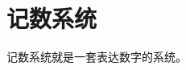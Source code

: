 \documentclass[book.tex]{subfiles}
\begin{document}
\section{记数系统}

记数系统就是一套表达数字的系统。
\end{document}
